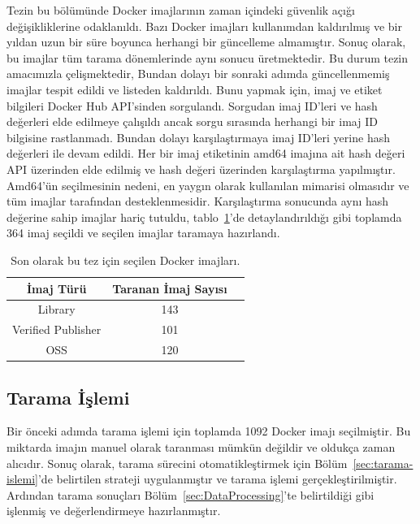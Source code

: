 Tezin bu bölümünde Docker imajlarının zaman içindeki güvenlik açığı değişikliklerine odaklanıldı. Bazı Docker imajları kullanımdan kaldırılmış ve bir yıldan uzun bir süre boyunca herhangi bir güncelleme almamıştır. Sonuç olarak, bu imajlar tüm tarama dönemlerinde aynı sonucu üretmektedir. Bu durum tezin amacımızla çelişmektedir, Bundan dolayı bir sonraki adımda güncellenmemiş imajlar tespit edildi ve listeden kaldırıldı. Bunu yapmak için, imaj ve etiket bilgileri Docker Hub API'sinden sorgulandı. Sorgudan imaj ID'leri ve hash değerleri elde edilmeye çalışıldı ancak sorgu sırasında herhangi bir imaj ID bilgisine rastlanmadı. Bundan dolayı karşılaştırmaya imaj ID'leri yerine hash değerleri ile devam edildi. Her bir imaj etiketinin amd64 imajına ait hash değeri API üzerinden elde edilmiş ve hash değeri üzerinden karşılaştırma yapılmıştır. Amd64'ün seçilmesinin nedeni, en yaygın olarak kullanılan mimarisi olmasıdır ve tüm imajlar tarafından desteklenmesidir. Karşılaştırma sonucunda aynı hash değerine sahip imajlar hariç tutuldu, tablo~\ref{tab:final-selected-images}'de detaylandırıldığı gibi toplamda 364 imaj seçildi ve seçilen imajlar taramaya hazırlandı.

\begin{table}
    \centering
    \begin{tabular}{ |c|c|c| }
        \hline
        İmaj Türü & Taranan İmaj Sayısı \\
        \hline
        Library & 143 \\
        Verified Publisher & 101 \\
        OSS & 120 \\
        \hline
    \end{tabular}
    \caption{Son olarak bu tez için seçilen Docker imajları.}\label{tab:final-selected-images}
\end{table}

\subsection{Tarama İşlemi}

Bir önceki adımda tarama işlemi için toplamda 1092 Docker imajı seçilmiştir. Bu miktarda imajın manuel olarak taranması mümkün değildir ve oldukça zaman alıcıdır. Sonuç olarak, tarama sürecini otomatikleştirmek için Bölüm~\ref{sec:tarama-islemi}'de belirtilen strateji uygulanmıştır ve tarama işlemi gerçekleştirilmiştir. Ardından tarama sonuçları Bölüm~\ref{sec:DataProcessing}'te belirtildiği gibi işlenmiş ve değerlendirmeye hazırlanmıştır.

